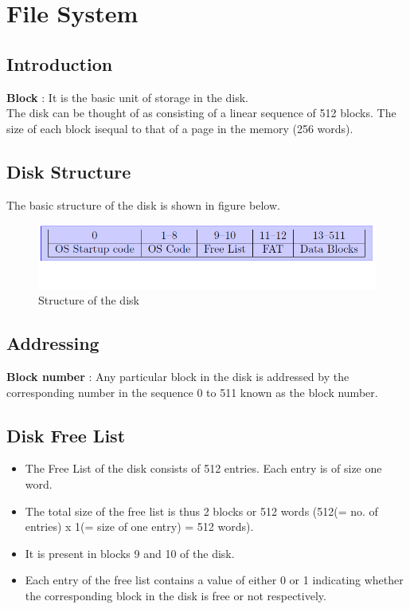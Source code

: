 \documentclass[11pt]{article}
\begin{document}
\section{File System}
\subsection{Introduction}

\textbf{Block} : It is the basic unit of storage in the disk.\\
The disk can be thought of as consisting of a linear sequence of 512 blocks. The size of each block isequal to that of a page in the memory (256 words).

\subsection{Disk Structure}
The basic structure of the disk is shown in figure below.

\begin{figure}[hbtp]
\begin{center}
\includegraphics[scale=0.5]{fileblockdiagram.png}
\end{center}
\caption{Structure of the disk}
\end{figure}


\subsection{Addressing}
\textbf{Block number} : Any particular block in the disk is addressed by the corresponding number in the sequence 0 to 511 known as the block number.

\subsection{Disk Free List}
\begin{itemize}
\item The Free List of the disk consists of 512 entries. Each entry is of size one word.
\item The total size of the free list is thus 2 blocks or 512 words (512(= no. of entries) x 1(= size of one entry) = 512 words).
\item It is present in blocks 9 and 10 of the disk.
\item Each entry of the free list contains a value of either 0 or 1 indicating whether the corresponding block in the disk is free or not respectively.
\end{itemize}
\end{document}
